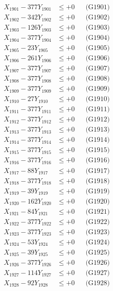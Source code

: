\documentclass[a4paper,10pt]{article}
\begin{document}
{\begin{align}
\allowbreak
X_{1901} - 377Y_{1901} &\leq +0 && \text{(G1901)} \\
X_{1902} - 342Y_{1902} &\leq +0 && \text{(G1902)} \\
X_{1903} - 126Y_{1903} &\leq +0 && \text{(G1903)} \\
X_{1904} - 377Y_{1904} &\leq +0 && \text{(G1904)} \\
X_{1905} - 23Y_{1905} &\leq +0 && \text{(G1905)} \\
X_{1906} - 261Y_{1906} &\leq +0 && \text{(G1906)} \\
X_{1907} - 377Y_{1907} &\leq +0 && \text{(G1907)} \\
X_{1908} - 377Y_{1908} &\leq +0 && \text{(G1908)} \\
X_{1909} - 377Y_{1909} &\leq +0 && \text{(G1909)} \\
X_{1910} - 27Y_{1910} &\leq +0 && \text{(G1910)} \\
\allowbreak
X_{1911} - 377Y_{1911} &\leq +0 && \text{(G1911)} \\
X_{1912} - 377Y_{1912} &\leq +0 && \text{(G1912)} \\
X_{1913} - 377Y_{1913} &\leq +0 && \text{(G1913)} \\
X_{1914} - 377Y_{1914} &\leq +0 && \text{(G1914)} \\
X_{1915} - 377Y_{1915} &\leq +0 && \text{(G1915)} \\
X_{1916} - 377Y_{1916} &\leq +0 && \text{(G1916)} \\
X_{1917} - 88Y_{1917} &\leq +0 && \text{(G1917)} \\
X_{1918} - 377Y_{1918} &\leq +0 && \text{(G1918)} \\
X_{1919} - 39Y_{1919} &\leq +0 && \text{(G1919)} \\
X_{1920} - 162Y_{1920} &\leq +0 && \text{(G1920)} \\
\allowbreak
X_{1921} - 84Y_{1921} &\leq +0 && \text{(G1921)} \\
X_{1922} - 377Y_{1922} &\leq +0 && \text{(G1922)} \\
X_{1923} - 377Y_{1923} &\leq +0 && \text{(G1923)} \\
X_{1924} - 53Y_{1924} &\leq +0 && \text{(G1924)} \\
X_{1925} - 39Y_{1925} &\leq +0 && \text{(G1925)} \\
X_{1926} - 377Y_{1926} &\leq +0 && \text{(G1926)} \\
X_{1927} - 114Y_{1927} &\leq +0 && \text{(G1927)} \\
X_{1928} - 92Y_{1928} &\leq +0 && \text{(G1928)} \\

\end{align}}
\end{document}
